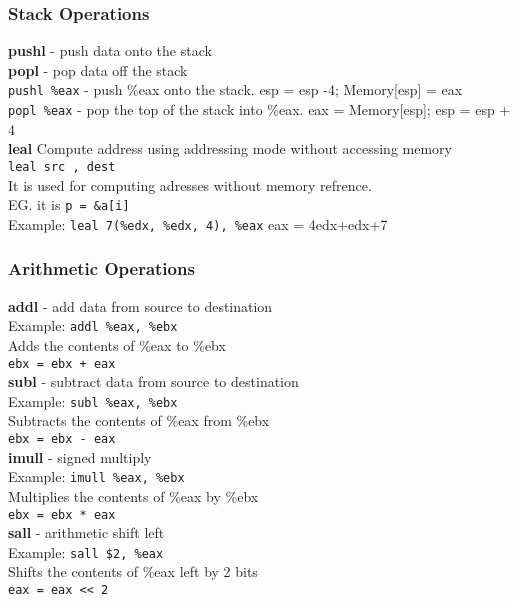 \documentclass[answers,12pt,addpoints]{exam}
\begin{document}
\subsubsection{Stack Operations}
\textbf{pushl} - push data onto the stack \\
\textbf{popl} - pop data off the stack \\
\texttt{pushl \%eax} - push \%eax onto the stack. esp = esp -4; Memory[esp] = eax \\
\texttt{popl \%eax} - pop the top of the stack into \%eax. eax = Memory[esp]; esp = esp + 4 \\
\textbf{leal} Compute address using addressing mode without accessing memory \\
\texttt{leal src , dest} \\
It is used for computing adresses without memory refrence. \\
EG. it is \texttt{p = \&a[i]} \\
Example: \texttt{leal 7(\%edx, \%edx, 4), \%eax} eax = 4edx+edx+7
\subsubsection{Arithmetic Operations}
\textbf{addl} - add data from source to destination \\
Example: \texttt{addl \%eax, \%ebx} \\
Adds the contents of \%eax to \%ebx \\
\texttt{ebx = ebx + eax} \\

\textbf{subl} - subtract data from source to destination \\
Example: \texttt{subl \%eax, \%ebx} \\
Subtracts the contents of \%eax from \%ebx \\
\texttt{ebx = ebx - eax} \\

\textbf{imull} - signed multiply \\
Example: \texttt{imull \%eax, \%ebx} \\
Multiplies the contents of \%eax by \%ebx \\
\texttt{ebx = ebx * eax} \\

\textbf{sall} - arithmetic shift left \\
Example: \texttt{sall \$2, \%eax} \\
Shifts the contents of \%eax left by 2 bits \\
\texttt{eax = eax << 2} \\
\end{document}
